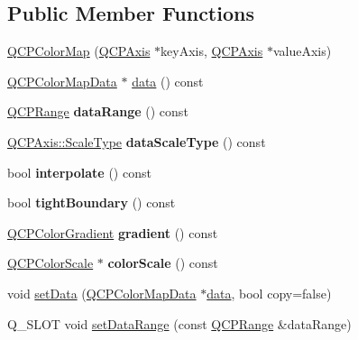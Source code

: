 \subsection*{Public Member Functions}
\begin{DoxyCompactItemize}
\item 
\hyperlink{classQCPColorMap_aa37e976d2ee1e2be6c4cd88a64b36215}{Q\+C\+P\+Color\+Map} (\hyperlink{classQCPAxis}{Q\+C\+P\+Axis} $\ast$key\+Axis, \hyperlink{classQCPAxis}{Q\+C\+P\+Axis} $\ast$value\+Axis)
\item 
\hyperlink{classQCPColorMapData}{Q\+C\+P\+Color\+Map\+Data} $\ast$ \hyperlink{classQCPColorMap_a047d7eb3ae657f93f2f39b5e68b79451}{data} () const
\item 
\mbox{\label{classQCPColorMap_ae478f0a5a016420d66c70cc33d6cda1d}} 
\hyperlink{classQCPRange}{Q\+C\+P\+Range} {\bfseries data\+Range} () const
\item 
\mbox{\label{classQCPColorMap_ab796f2dccc90fb7a354b6732c33ec9be}} 
\hyperlink{classQCPAxis_a36d8e8658dbaa179bf2aeb973db2d6f0}{Q\+C\+P\+Axis\+::\+Scale\+Type} {\bfseries data\+Scale\+Type} () const
\item 
\mbox{\label{classQCPColorMap_a15d1877883fa463d44bfcbfd6840d4ca}} 
bool {\bfseries interpolate} () const
\item 
\mbox{\label{classQCPColorMap_a53b5d26b28d6027af0fc863f057965db}} 
bool {\bfseries tight\+Boundary} () const
\item 
\mbox{\label{classQCPColorMap_acc4bb87c903607b96c08d2bc34bc24cd}} 
\hyperlink{classQCPColorGradient}{Q\+C\+P\+Color\+Gradient} {\bfseries gradient} () const
\item 
\mbox{\label{classQCPColorMap_a9d37d08c467ac645b86fc71a3b151208}} 
\hyperlink{classQCPColorScale}{Q\+C\+P\+Color\+Scale} $\ast$ {\bfseries color\+Scale} () const
\item 
void \hyperlink{classQCPColorMap_a5a23e133a20c4ccad35fd32e6c0f9809}{set\+Data} (\hyperlink{classQCPColorMapData}{Q\+C\+P\+Color\+Map\+Data} $\ast$\hyperlink{classQCPColorMap_a047d7eb3ae657f93f2f39b5e68b79451}{data}, bool copy=false)
\item 
Q\+\_\+\+S\+L\+OT void \hyperlink{classQCPColorMap_a980b42837821159786a85b4b7dcb8774}{set\+Data\+Range} (const \hyperlink{classQCPRange}{Q\+C\+P\+Range} \&data\+Range)

\end{DoxyCompactItemize}
